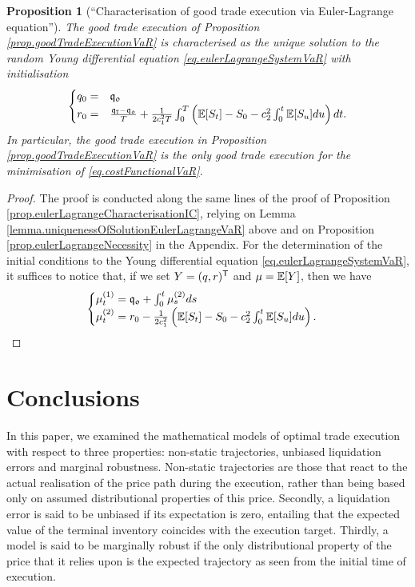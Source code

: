 \documentclass[10pt,a4paper]{article}
\newtheorem{prop}[thm]{Proposition}
\begin{document}
\begin{prop}[``Characterisation of good trade execution via Euler-Lagrange equation'']\label{prop.characterisationEulerLagrangeVaR}
	The good trade execution of Proposition \ref{prop.goodTradeExecutionVaR} is characterised as the unique solution to the random Young differential equation \eqref{eq.eulerLagrangeSystemVaR} with initialisation
	\begin{equation*}
	\begin{cases}
	q_0 =& \mathfrak{q_0} \\
	r_0 =& \frac{\mathfrak{q}_{\mathtt{T} } - \mathfrak{q_0}}{T}  +\frac{1}{2c_{1}^{2} T} \int_{0}^{T} \left(\mathbb{{E}}[S_t] - S_0 - c_{2}^{2} \int_{0}^{t} \mathbb{{E}}[S_u]du\right)dt.
	\end{cases}
	\end{equation*}
	In particular, the good trade execution in Proposition \ref{prop.goodTradeExecutionVaR} is the only good trade execution for the minimisation of \eqref{eq.costFunctionalVaR}.
\end{prop}
\begin{proof}
	The proof is conducted along the same lines of the proof of Proposition \ref{prop.eulerLagrangeCharacterisationIC}, relying  on Lemma \ref{lemma.uniquenessOfSolutionEulerLagrangeVaR} above and on Proposition \ref{prop.eulerLagrangeNecessity} in the Appendix. For the determination of the initial conditions to the Young differential equation \eqref{eq.eulerLagrangeSystemVaR}, it suffices to notice that, if we set $Y=(q,r)^{\mathsf{T}}$ and $\mu=\mathbb{{E}}[Y]$, then we have
	\begin{equation*}
	\begin{cases}
	\mu^{(1)}_t = \mathfrak{q_0} + \int_{0}^{t} \mu^{(2)}_s ds \\
	\mu^{(2)}_t = r_0 - \frac{1}{2c_{1}^{2}} \left(\mathbb{{E}}[S_t] -S_0 - c_{2}^{2} \int_{0}^{t} \mathbb{{E}}[S_u]du \right).
	\end{cases}
	\end{equation*}
	
\end{proof}


\section{Conclusions}\label{sec.conclusions}
In this paper, we examined the mathematical models of optimal trade execution with respect to three properties: non-static trajectories, unbiased liquidation errors and marginal robustness. Non-static trajectories are those that react to the actual realisation of the price path during the execution, rather than being based only on assumed distributional properties of this price. Secondly, a liquidation error is said to be unbiased if its expectation is zero, entailing that the expected value of the terminal  inventory coincides with the execution target.  Thirdly, a model is said to be marginally robust if the only distributional property of the price that it relies upon is the expected trajectory as seen from the initial time of execution. 
\end{document}
